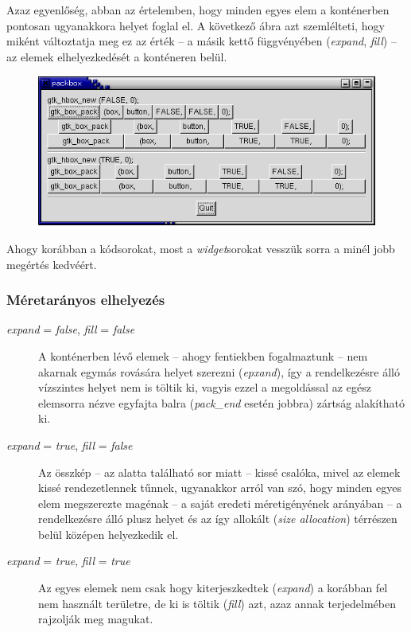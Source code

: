 Azaz egyenlőség, abban az értelemben, hogy minden egyes elem a konténerben pontosan ugyanakkora helyet foglal el. A következő ábra azt szemlélteti, hogy miként változtatja meg ez az érték -- a másik kettő függvényében (\textit{expand}, \textit{fill}) -- az elemek elhelyezkedését a konténeren belül.

\vspace{12 pt}
\begin{figure}[H]
\begin{center}
\includegraphics[height=50mm]{images/packbox1.png}
\end{center}
\end{figure}

Ahogy korábban a kódsorokat, most a \textit{widget}sorokat vesszük sorra a minél jobb megértés kedvéért.

\subsubsection{Méretarányos elhelyezés}

\begin{description}
 \item[\textit{expand} = \textit{false}, \textit{fill} = \textit{false}] A konténerben lévő elemek -- ahogy fentiekben fogalmaztunk -- nem akarnak egymás rovására helyet szerezni (\textit{epxand}), így a rendelkezésre álló vízszintes helyet nem is töltik ki, vagyis ezzel a megoldással az egész elemsorra nézve egyfajta balra (\textit{pack\_end} esetén jobbra) zártság alakítható ki.

 \item[\textit{expand} = \textit{true}, \textit{fill} = \textit{false}] Az összkép -- az alatta található sor miatt -- kissé csalóka, mivel az elemek kissé rendezetlennek tűnnek, ugyanakkor arról van szó, hogy minden egyes elem megszerezte magénak -- a saját eredeti méretigényének arányában -- a rendelkezésre álló plusz helyet és az így allokált (\textit{size allocation}) térrészen belül középen helyezkedik el.

 \item[\textit{expand} = \textit{true}, \textit{fill} = \textit{true}] Az egyes elemek nem csak hogy kiterjeszkedtek (\textit{expand}) a korábban fel nem használt területre, de ki is töltik (\textit{fill}) azt, azaz annak terjedelmében rajzolják meg magukat.
\end{description}

